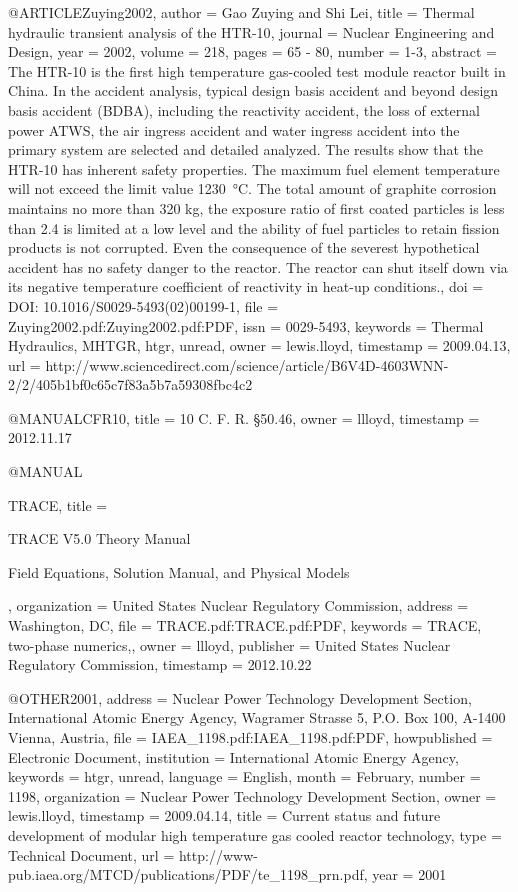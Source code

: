 {{@ARTICLE{Zuying2002,
  author = {Gao Zuying and Shi Lei},
  title = {Thermal hydraulic transient analysis of the HTR-10},
  journal = {Nuclear Engineering and Design},
  year = {2002},
  volume = {218},
  pages = {65 - 80},
  number = {1-3},
  abstract = {The HTR-10 is the first high temperature gas-cooled test module reactor
	built in China. In the accident analysis, typical design basis accident
	and beyond design basis accident (BDBA), including the reactivity
	accident, the loss of external power ATWS, the air ingress accident
	and water ingress accident into the primary system are selected and
	detailed analyzed. The results show that the HTR-10 has inherent
	safety properties. The maximum fuel element temperature will not
	exceed the limit value 1230 °C. The total amount of graphite corrosion
	maintains no more than 320 kg, the exposure ratio of first coated
	particles is less than 2.4%
	is limited at a low level and the ability of fuel particles to retain
	fission products is not corrupted. Even the consequence of the severest
	hypothetical accident has no safety danger to the reactor. The reactor
	can shut itself down via its negative temperature coefficient of
	reactivity in heat-up conditions.},
  doi = {DOI: 10.1016/S0029-5493(02)00199-1},
  file = {Zuying2002.pdf:Zuying2002.pdf:PDF},
  issn = {0029-5493},
  keywords = {Thermal Hydraulics, MHTGR, htgr, unread},
  owner = {lewis.lloyd},
  timestamp = {2009.04.13},
  url = {http://www.sciencedirect.com/science/article/B6V4D-4603WNN-2/2/405b1bf0c65c7f83a5b7a59308fbc4c2}
}

@MANUAL{CFR10,
  title = {{10 C. F. R. \S 50.46}},
  owner = {llloyd},
  timestamp = {2012.11.17}
}

@MANUAL{TRACE,
  title = {{TRACE V5.0} Theory Manual
	
	Field Equations, Solution Manual, and Physical Models},
  organization = {United States Nuclear Regulatory Commission},
  address = {Washington, DC},
  file = {TRACE.pdf:TRACE.pdf:PDF},
  keywords = {TRACE, two-phase numerics,},
  owner = {llloyd},
  publisher = {United States Nuclear Regulatory Commission},
  timestamp = {2012.10.22}
}

@OTHER{2001,
  address = {Nuclear Power Technology Development Section, International Atomic
	Energy Agency, Wagramer Strasse 5, P.O. Box 100, A-1400 Vienna, Austria},
  file = {IAEA_1198.pdf:IAEA_1198.pdf:PDF},
  howpublished = {Electronic Document},
  institution = {International Atomic Energy Agency},
  keywords = {htgr, unread},
  language = {English},
  month = {February},
  number = {1198},
  organization = {Nuclear Power Technology Development Section},
  owner = {lewis.lloyd},
  timestamp = {2009.04.14},
  title = {Current status and future development of modular high temperature
	gas cooled reactor technology},
  type = {Technical Document},
  url = {http://www-pub.iaea.org/MTCD/publications/PDF/te_1198_prn.pdf},
  year = {2001}
}

}}
